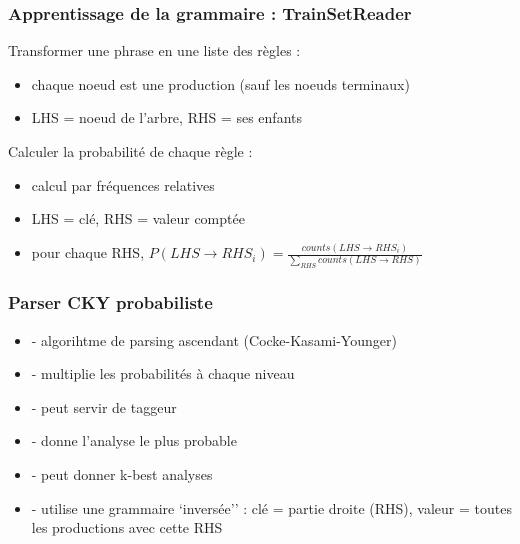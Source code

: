 \documentclass{beamer}
\begin{document}
\begin{frame}
\frametitle{Apprentissage de la grammaire : TrainSetReader}
Transformer une phrase en une liste des r\`egles : 
\begin{itemize}
  \item chaque noeud est une production (sauf les noeuds terminaux)
  \item LHS = noeud de l'arbre, RHS = ses enfants
\end{itemize}
Calculer la probabilit\'e de chaque r\`egle : 
\begin{itemize}
  \item calcul par fr\'equences relatives
  \item LHS = cl\'e, RHS = valeur compt\'ee
  \item pour chaque RHS, $P(LHS \rightarrow RHS_{i}) = \frac{counts(LHS
  \rightarrow RHS_{i})}{\sum_{RHS}counts(LHS \rightarrow RHS)}$
\end{itemize}
\end{frame}

\begin{frame}
\frametitle{Parser CKY probabiliste}
\begin{itemize}
  \item - algorihtme de parsing ascendant (Cocke-Kasami-Younger)
  \item - multiplie les probabilit\'es \`a chaque niveau
  \item - peut servir de taggeur
  \item - donne l'analyse le plus probable
  \item - peut donner k-best analyses
  \item - utilise une grammaire `invers\'ee'' : cl\'e = partie droite
  (RHS), valeur = toutes les productions avec cette RHS
\end{itemize}
\end{frame}
\end{document}
